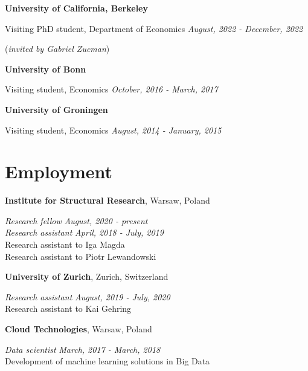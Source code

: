 \documentclass[margin,line]{res}
\newenvironment{list1}{
  \begin{list}{\ding{113}}{%
      \setlength{\itemsep}{0in}
      \setlength{\parsep}{0in} \setlength{\parskip}{0in}
      \setlength{\topsep}{0in} \setlength{\partopsep}{0in} 
      \setlength{\leftmargin}{0.17in}}}{\end{list}}
\begin{document}
\begin{resume}
{\bf University of California, Berkeley}\\
\vspace*{-.1in}
\begin{list1}
	\item[] Visiting PhD student, Department of Economics \hfill \textit{August, 2022 - December, 2022}
	\item[] (\textit{invited by Gabriel Zucman})
\end{list1}

{\bf University of Bonn}\\
\vspace*{-.1in}
\begin{list1}
\item[] Visiting student, Economics \hfill \textit{October, 2016 - March, 2017}
\end{list1}

{\bf University of Groningen}\\
\vspace*{-.1in}
\begin{list1}
\item[] Visiting student, Economics \hfill \textit{August, 2014 - January, 2015}
\end{list1}

\section{\sc Employment}
{\bf Institute for Structural Research}, Warsaw, Poland

\vspace{-.3cm}
{\em Research fellow} \hfill \textit{August, 2020 - present}\\
{\em Research assistant} \hfill \textit{April, 2018 - July, 2019}\\
Research assistant to Iga Magda\\ 
Research assistant to Piotr Lewandowski 
\vspace*{.05in} 

{\bf University of Zurich}, Zurich, Switzerland

\vspace{-.3cm}
{\em Research assistant} \hfill \textit{August, 2019 - July, 2020}\\
Research assistant to Kai Gehring
\vspace*{.05in}  

{\bf Cloud Technologies}, Warsaw, Poland

\vspace{-.3cm}
{\em Data scientist} \hfill \textit{March, 2017 - March, 2018}\\
Development of machine learning solutions in Big Data
\vspace*{.05in}  


\end{resume}
\end{document}
